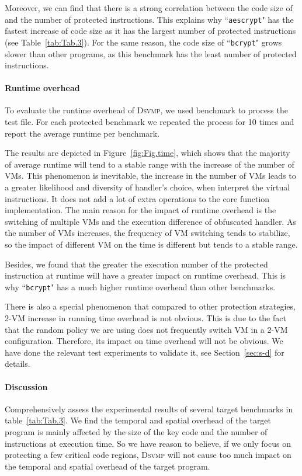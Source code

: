 \documentclass[preprint,12pt,3p]{elsarticle}
\newcommand{\DSVMP}{\textsc{Dsvmp}\xspace}
\begin{document}
Moreover, we can find that there is a strong correlation between the code size of and the number of protected instructions.
This explains why ``\texttt{aescrypt}" has the fastest increase of code size as it has
the largest number of protected instructions (see Table~\ref{tab:Tab.3}).
For the same reason, the code size of ``\texttt{bcrypt}" grows slower than other programs,
as this benchmark has the least number of protected instructions.


\paragraph*{Runtime overhead} To evaluate the runtime overhead of \DSVMP, we used benchmark to process the test file.
For each protected benchmark we repeated the process for 10 times and report the average runtime per benchmark.

The results are depicted in Figure~\ref{fig:Fig.time},
which shows that the majority of average runtime will tend to a stable range with the increase of the number of VMs.
This phenomenon is inevitable, the increase in the number of VMs leads to a
greater likelihood and diversity of handler's choice, when interpret the virtual instructions.
It does not add a lot of extra operations to the core function implementation.
The main reason for the impact of runtime overhead is the switching of multiple VMs
and the execution difference of obfuscated handler.
As the number of VMs increases, the frequency of VM switching tends to stabilize,
so the impact of different VM on the time is different but tends to a stable range.

Besides, we found that the greater the execution number of the protected instruction at runtime
will have a greater impact on runtime overhead.
This is why ``\texttt{bcrypt}" has a much higher runtime overhead than other benchmarks.

There is also a special phenomenon that compared to other protection strategies,
2-VM increase in running time overhead is not obvious.
This is due to the fact that the random policy we are using does not frequently switch VM in a 2-VM configuration.
Therefore, its impact on time overhead will not be obvious.
We have done the relevant test experiments to validate it, see Section~\ref{sec:s-d} for details.


\paragraph*{Discussion}
Comprehensively assess the experimental results of several target benchmarks in table~\ref{tab:Tab.3}.
We find the temporal and spatial overhead of the target program is mainly affected by
the size of the key code and the number of instructions at execution time.
So we have reason to believe, if we only focus on protecting a few critical code regions,
\DSVMP will not cause too much impact on the temporal and spatial overhead of the target program.
\end{document}
